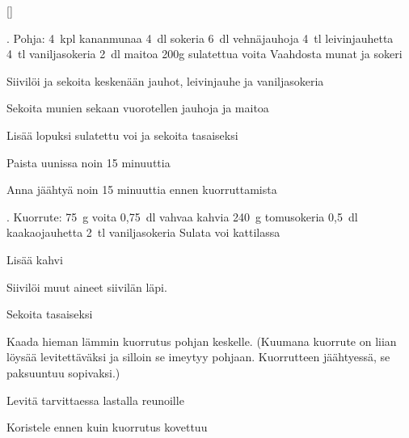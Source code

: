 []

\begin{step}
    . Pohja:
    4~kpl kananmunaa
    4~dl sokeria
    6~dl vehnäjauhoja
    4~tl leivinjauhetta
    4~tl vaniljasokeria
    2~dl maitoa
    200g sulatettua voita
    \method
    Vaahdosta munat ja sokeri

    Siivilöi ja sekoita keskenään jauhot, leivinjauhe ja vaniljasokeria

    Sekoita munien sekaan vuorotellen jauhoja ja maitoa

    Lisää lopuksi sulatettu voi ja sekoita tasaiseksi

    Paista  uunissa noin 15 minuuttia

    Anna jäähtyä noin 15 minuuttia ennen kuorruttamista
\end{step}

\begin{step}
    . Kuorrute:
    75~g voita
    0,75~dl vahvaa kahvia
    240~g tomusokeria
    0,5~dl kaakaojauhetta
    2~tl vaniljasokeria
    \method
    Sulata voi kattilassa

    Lisää kahvi

    Siivilöi muut aineet siivilän läpi.

    Sekoita tasaiseksi

    Kaada hieman lämmin kuorrutus pohjan keskelle. (Kuumana kuorrute on liian löysää levitettäväksi ja silloin se imeytyy pohjaan. Kuorrutteen jäähtyessä, se paksuuntuu sopivaksi.)

    Levitä tarvittaessa lastalla reunoille

    Koristele ennen kuin kuorrutus kovettuu
\end{step}
